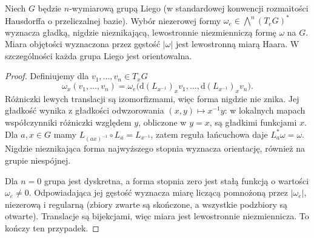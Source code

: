 \begin{lemat}
\label{it:lem:haar-lie-volume}
Niech $G$ będzie $n$-wymiarową grupą Liego
(w standardowej konwencji rozmaitości Hausdorffa
o przeliczalnej bazie). Wybór niezerowej formy
$\omega_e\in\bigwedge^n(T_eG)^*$ wyznacza
gładką, nigdzie nieznikającą, lewostronnie
niezmienniczą formę $\omega$ na $G$.
Miara objętości wyznaczona przez gęstość $|\omega|$
jest lewostronną miarą Haara.
W szczególności każda grupa Liego jest orientowalna.
\end{lemat}
\begin{proof}
Definiujemy dla $v_1,\ldots,v_n\in T_xG$
\[
 \omega_x(v_1,\ldots,v_n)=
 \omega_e\bigl(\mathrm d(L_{x^{-1}})_xv_1,\ldots,
                \mathrm d(L_{x^{-1}})_xv_n\bigr).
\]
Różniczki lewych translacji są izomorfizmami,
więc forma nigdzie nie znika. Jej gładkość wynika
z gładkości odwzorowania $(x,y)\mapsto x^{-1}y$:
w lokalnych mapach współczynniki różniczki względem
$y$, obliczone w $y=x$, są gładkimi funkcjami $x$.
Dla $a,x\in G$ mamy
$L_{(ax)^{-1}}\circ L_a=L_{x^{-1}}$,
zatem reguła łańcuchowa daje $L_a^*\omega=\omega$.
Nigdzie nieznikająca forma najwyższego stopnia
wyznacza orientację, również na grupie niespójnej.

Dla $n=0$ grupa jest dyskretna, a forma stopnia
zero jest stałą funkcją o wartości $\omega_e\ne0$.
Odpowiadająca jej gęstość wyznacza miarę liczącą
pomnożoną przez $|\omega_e|$, niezerową i regularną
(zbiory zwarte są skończone, a wszystkie podzbiory
są otwarte). Translacje są bijekcjami, więc miara
jest lewostronnie niezmiennicza. To kończy ten przypadek.


\end{proof}
